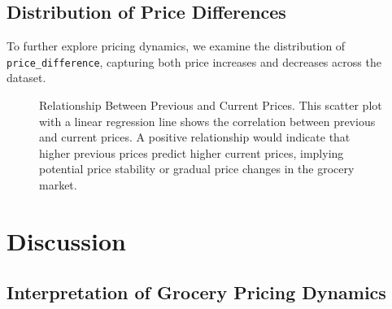 \documentclass[
  letterpaper,
  DIV=11,
  numbers=noendperiod]{scrartcl}
\begin{document}
\subsection{Distribution of Price
Differences}\label{distribution-of-price-differences}

To further explore pricing dynamics, we examine the distribution of
\texttt{price\_difference}, capturing both price increases and decreases
across the dataset.

\begin{figure}


\caption{\label{fig-dist-price}Relationship Between Previous and Current
Prices. This scatter plot with a linear regression line shows the
correlation between previous and current prices. A positive relationship
would indicate that higher previous prices predict higher current
prices, implying potential price stability or gradual price changes in
the grocery market.}

\end{figure}%

\section{Discussion}\label{discussion}

\subsection{Interpretation of Grocery Pricing
Dynamics}\label{interpretation-of-grocery-pricing-dynamics}
\end{document}
